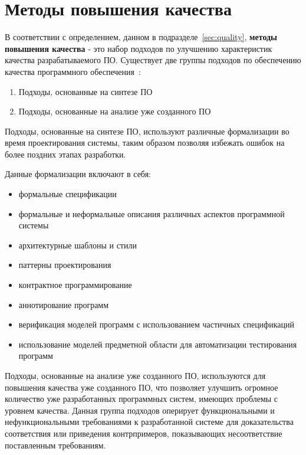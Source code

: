 \section{Методы повышения качества}
\label{sec:quality_methods}

В соответствии с определением, данном в подразделе~\ref{sec:quality},
\textbf{методы повышения качества} - это набор подходов по улучшению
характеристик качества разрабатываемого ПО. Существует две группы подходов по
обеспечению качества программного обеспечения~\cite{itsykson}:

\begin{enumerate}
    \item Подходы, основанные на синтезе ПО
    \item Подходы, основанные на анализе уже созданного ПО
\end{enumerate}

Подходы, основанные на синтезе ПО, используют различные формализации во время
проектирования системы, таким образом позволяя избежать ошибок на более поздних
этапах разработки.

Данные формализации включают в себя:

\begin{itemize}
    \item формальные спецификации
    \item формальные и неформальные описания различных аспектов программной
    системы
    \item архитектурные шаблоны и стили
    \item паттерны проектирования
    \item контрактное программирование
    \item аннотирование программ
    \item верификация моделей программ с использованием частичных спецификаций
    \item использование моделей предметной области для автоматизации
    тестирования программ
\end{itemize}

Подходы, основанные на анализе уже созданного ПО, используются для повышения
качества уже созданного ПО, что позволяет улучшить огромное количество уже
разработанных программных систем, имеющих проблемы с уровнем качества. Данная
группа подходов оперирует функциональными и нефункциональными требованиями к
разработанной системе для доказательства соответствия или приведения
контрпримеров, показывающих несоответствие поставленным требованиям.

